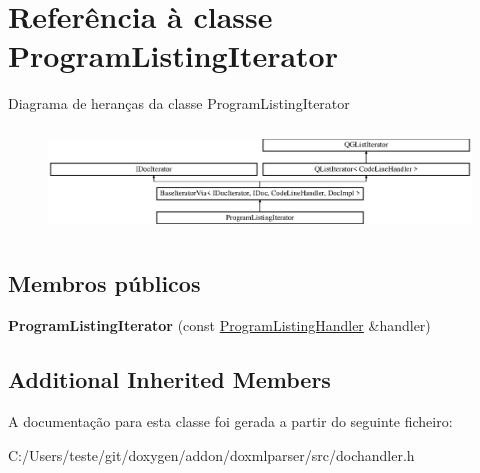 \hypertarget{class_program_listing_iterator}{\section{Referência à classe Program\-Listing\-Iterator}
\label{class_program_listing_iterator}
}
Diagrama de heranças da classe Program\-Listing\-Iterator\begin{figure}[H]
\begin{center}
\leavevmode
\includegraphics[height=2.842639cm]{class_program_listing_iterator}
\end{center}
\end{figure}
\subsection*{Membros públicos}
\begin{DoxyCompactItemize}
\item 
\hypertarget{class_program_listing_iterator_aa4411119593704c07909ba6596c95d9b}{{\bfseries Program\-Listing\-Iterator} (const \hyperlink{class_program_listing_handler}{Program\-Listing\-Handler} \&handler)}\label{class_program_listing_iterator_aa4411119593704c07909ba6596c95d9b}

\end{DoxyCompactItemize}
\subsection*{Additional Inherited Members}


A documentação para esta classe foi gerada a partir do seguinte ficheiro\-:\begin{DoxyCompactItemize}
\item 
C\-:/\-Users/teste/git/doxygen/addon/doxmlparser/src/dochandler.\-h\end{DoxyCompactItemize}
